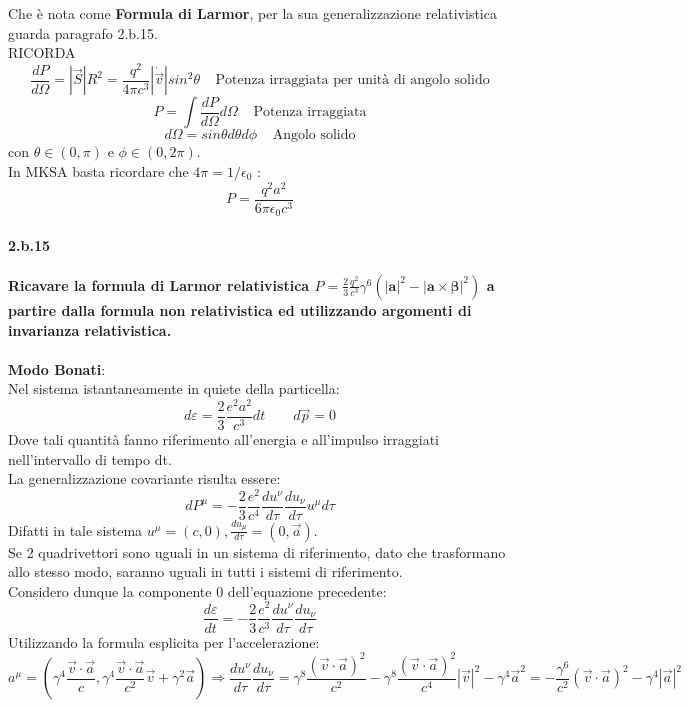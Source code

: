 \documentclass[twoside]{article}
\begin{document}
Che è nota come \textbf{Formula di Larmor}, per la sua generalizzazione relativistica guarda paragrafo 2.b.15.\\
RICORDA\\
\[
\frac{dP}{d\Omega}=|\vec{S}| R^2 =\frac{q^2}{4 \pi c^3}|\dot{\vec{v}}|sin^2\theta \;\;\;\; \text{Potenza irraggiata per unità di angolo solido}
\]
\[
P=\int \frac{dP}{d\Omega} d\Omega \;\;\;\; \text{Potenza irraggiata}
\]
\[
d\Omega = sin\theta d\theta d\phi \;\;\;\; \text{Angolo solido}
\]
con $\theta \in (0, \pi)$ e $\phi \in (0, 2\pi)$.\\
In MKSA basta ricordare che $4 \pi= 1/\epsilon_0$ :
\[
P=\frac{q^2a^2}{6 \pi \epsilon_0 c^3}
\]



\paragraph{2.b.15}\textbf{Ricavare la formula di Larmor relativistica  $P=\frac{2}{3}\frac{q^2}{c^3} \gamma^6 (|\mathbf{a}|^2-|\mathbf{a}\times\bm{\beta}|^2)$ a partire dalla
formula non relativistica ed utilizzando argomenti di invarianza relativistica.}\\
\\
\textbf{Modo Bonati}:\\
Nel sistema istantaneamente in quiete della particella:
\begin{equation}
d\varepsilon=\frac{2}{3}\frac{e^2a^2}{c^3}dt \qquad   d\vec{p}=0
\end{equation}
Dove tali quantità fanno riferimento all'energia e all'impulso irraggiati nell'intervallo di tempo dt.\\
La generalizzazione covariante risulta essere:
\begin{equation}
    dP^\mu=-\frac{2}{3}\frac{e^2}{c^4}\frac{du^\nu}{d\tau}\frac{du_\nu}{d\tau}u^\mu d\tau
\end{equation}
Difatti in tale sistema $u^\mu=(c,0), \frac{du_\mu}{d\tau}=(0,\vec{a})$.\\
Se 2 quadrivettori sono uguali in un sistema di riferimento, dato che trasformano allo stesso modo, saranno uguali in tutti i sistemi di riferimento.\\
Considero dunque la componente 0 dell'equazione precedente:
\begin{equation}
    \frac{d\varepsilon}{dt}=-\frac{2}{3}\frac{e^2}{c^3}\frac{du^\nu}{d\tau}\frac{du_\nu}{d\tau}
\end{equation}
Utilizzando la formula esplicita per l'accelerazione:
\begin{equation}
    a^\mu=\left(\gamma^4\frac{\vec{v}\cdot\vec{a}}{c},\gamma^4\frac{\vec{v}\cdot\vec{a}}{c^2}\vec{v}+\gamma^2\vec{a}\right)\Longrightarrow \frac{du^\nu}{d\tau}\frac{du_\nu}{d\tau}=\gamma^8\frac{(\vec{v}\cdot\vec{a})^2}{c^2}-\gamma^8\frac{(\vec{v}\cdot\vec{a})^2}{c^4}|\vec{v}|^2-\gamma^4\vec{a}^2=-\frac{\gamma^6}{c^2}(\vec{v}\cdot \vec{a})^2-\gamma^4|\vec{a}|^2
\end{equation}
\end{document}
